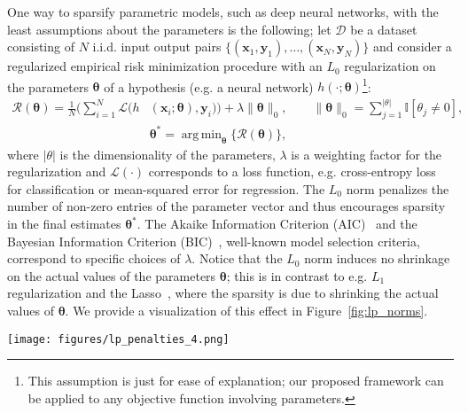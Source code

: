 \documentclass{article} %
\def\!#1{\boldsymbol{#1}}
\def\*#1{\mathbf{#1}}
\DeclareMathOperator*{\argmin}{arg\,min}
\begin{document}
One way to sparsify parametric models, such as deep neural networks, with the least assumptions about the parameters is the following; let $\mathcal{D}$ be a dataset consisting of $N$ i.i.d. input output pairs $\{(\*x_1, \*y_1), \dots, (\*x_N, \*y_N)\}$ and consider a regularized empirical risk minimization procedure with an  $L_0$ regularization on the parameters $\!\theta$ of a hypothesis (e.g. a neural network) $h(\cdot; \!\theta)$\footnote{This assumption is just for ease of explanation; our proposed framework can be applied to any objective function involving parameters.}:
\begin{align}
	\mathcal{R}(\!\theta) = \frac{1}{N}\bigg(\sum_{i=1}^{N}\mathcal{L}\big(h&(\*x_i;\!\theta), \*y_i\big)\bigg) + \lambda \|\!\theta\|_0,\qquad \|\!\theta\|_0 = \sum_{j=1}^{|\theta|}\mathbb{I}[\theta_j \neq 0], \label{eq:erm_l0}\\
	& \!\theta^* = \argmin_{\!\theta}\{\mathcal{R}(\!\theta)\}\nonumber,
\end{align}
where $|\theta|$ is the dimensionality of the parameters, $\lambda$ is a weighting factor for the regularization and $\mathcal{L}(\cdot)$ corresponds to a loss function, e.g. cross-entropy loss for classification or mean-squared error for regression. The $L_0$ norm penalizes the number of non-zero entries of the parameter vector and thus encourages sparsity in the final estimates $\!\theta^*$. The Akaike Information Criterion (AIC)~\citep{akaike1998information} and the Bayesian Information Criterion (BIC)~\citep{schwarz1978estimating}, well-known model selection criteria, correspond to specific choices of $\lambda$. Notice that the $L_0$ norm induces no shrinkage on the actual values of the parameters $\!\theta$; this is in contrast to e.g. $L_1$ regularization and the Lasso~\citep{tibshirani1996regression}, where the sparsity is due to shrinking the actual values of $\!\theta$. We provide a visualization of this effect in Figure~\ref{fig:lp_norms}.

\begin{figure*}[t]
    \centering
    \texttt{[image: figures/lp\_penalties\_4.png]}
    \caption{$L_p$ norm penalties for a parameter $\theta$ according to different values of $p$. It is easily observed that both weight decay and Lasso, $p=2$ and $p=1$ respectively, impose shrinkage for large values of $\theta$. By gradually allowing $p < 1$ we observe that the shrinkage is reduced and at the limit of $p=0$ we observe that the penalty is a constant for $\theta \neq 0$.}\label{fig:lp_norms}
\end{figure*}
\end{document}
